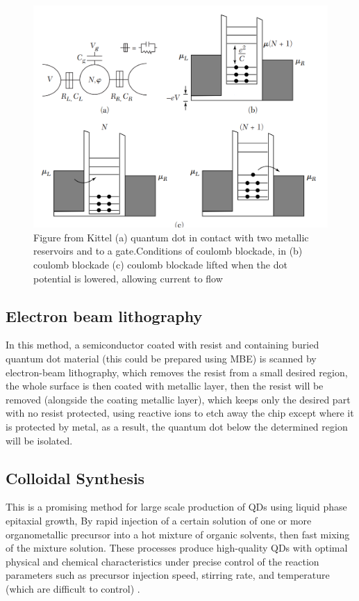 \documentclass[twoside,11pt]{article}
\begin{document}
        \begin{figure}[h]
            \centering
            \includegraphics[scale = 0.4]{2024-04-06 (1).png}
            \caption{Figure from Kittel (a) quantum dot in contact with two metallic reservoirs and to a gate.Conditions of coulomb blockade, in (b) coulomb blockade (c) coulomb blockade lifted when the dot potential is lowered, allowing current to flow}
            \label{coloumb blockade}
        \end{figure}

    \subsection{Electron beam lithography}
    In this method, a semiconductor coated with resist and containing buried quantum dot material (this could be prepared using MBE) is scanned by electron-beam lithography, which removes the resist from a small desired region, the whole surface is then coated with metallic layer, then the resist will be removed (alongside the coating metallic layer), which keeps only the desired part with no resist protected, using reactive ions to etch away the chip except where it is protected by metal, as a result, the quantum dot below the determined region will be isolated.\cite{reed1993quantum}

    \subsection{Colloidal Synthesis}
    This is a promising method for large scale production of QDs using liquid phase epitaxial growth, By rapid injection of a certain solution of one or more organometallic precursor into a hot mixture of organic solvents, then fast mixing of the mixture solution. These processes produce high-quality QDs with optimal physical and chemical characteristics under precise control of the reaction parameters such as precursor injection speed, stirring rate, and temperature (which are difficult to control) \cite{pu2018colloidal}.
\end{document}
